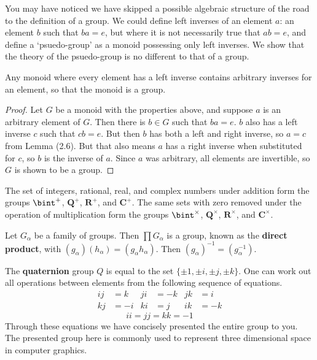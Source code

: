 You may have noticed we have skipped a possible algebraic structure of the road to the definition of a group. We could define left inverses of an element $a$: an element $b$ such that $ba = e$, but where it is not necessarily true that $ab = e$, and define a `psuedo-group' as a monoid possessing only left inverses. We show that the theory of the psuedo-group is no different to that of a group.

\begin{theorem}
    Any monoid where every element has a left inverse contains arbitrary inverses for an element, so that the monoid is a group.
\end{theorem}
\begin{proof}
    Let $G$ be a monoid with the properties above, and suppose $a$ is an arbitrary element of $G$. Then there is $b \in G$ such that $ba = e$. $b$ also has a left inverse $c$ such that $cb = e$. But then $b$ has both a left and right inverse, so $a = c$ from Lemma (2.6). But that also means $a$ has a right inverse when substituted for $c$, so $b$ is the inverse of $a$. Since $a$ was arbitrary, all elements are invertible, so $G$ is shown to be a group.
\end{proof}

\begin{example}
    The set of integers, rational, real, and complex numbers under addition form the groups $\bint^+$, $\mathbf{Q}^+$, $\mathbf{R}^+$, and $\mathbf{C}^+$. The same sets with zero removed under the operation of multiplication form the groups $\bint^\times$, $\mathbf{Q}^\times$, $\mathbf{R}^\times$, and $\mathbf{C}^\times$.
\end{example}

\begin{example}
    Let $G_\alpha$ be a family of groups. Then $\prod G_\alpha$ is a group, known as the {\bf direct product}, with $(g_\alpha) (h_\alpha) = (g_\alpha h_\alpha)$. Then $(g_\alpha)^{-1} = (g_\alpha^{-1})$.
\end{example}

\begin{example}
    The {\bf quaternion} group $Q$  is equal to the set $\{ \pm 1, \pm i, \pm j, \pm k \}$. One can work out all operations between elements from the following sequence of equations.
    \begin{align*}
                   ij &= k & ji &= -k & jk &= i\\
                   kj &= -i & ki &= j & ik &= -k
    \end{align*}
    \[ii = jj = kk = -1\]
    Through these equations we have concisely presented the entire group to you. The presented group here is commonly used to represent three dimensional space in computer graphics.
\end{example}

